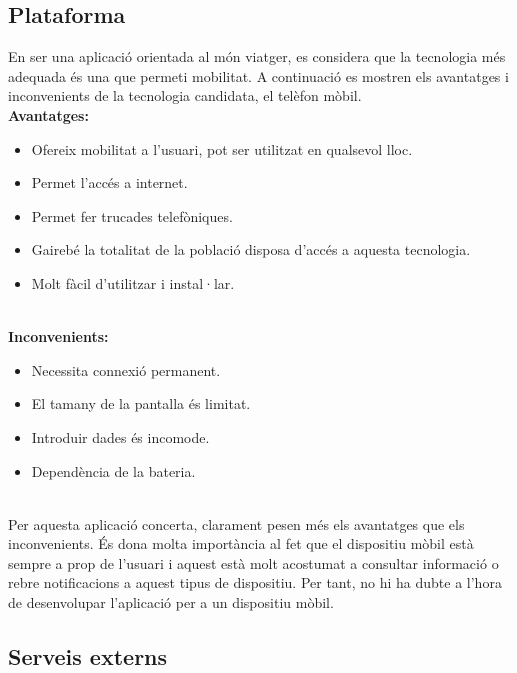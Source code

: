 \subsection{Plataforma}
En ser una aplicació orientada al món viatger, es considera que la tecnologia més adequada és una que permeti mobilitat. A continuació es mostren els avantatges i inconvenients de la tecnologia candidata, el telèfon mòbil.\\
\textbf{Avantatges:}
\begin{itemize}
\item{}Ofereix mobilitat a l'usuari, pot ser utilitzat en qualsevol lloc.
\item{}Permet l'accés a internet.
\item{}Permet fer trucades telefòniques.
\item{}Gairebé la totalitat de la població disposa d'accés a aquesta tecnologia.
\item{}Molt fàcil d'utilitzar i instal·lar.
\end{itemize}
\\
\textbf{Inconvenients:}
\begin{itemize}
\item{}Necessita connexió permanent.
\item{}El tamany de la pantalla és limitat.
\item{}Introduir dades és incomode.
\item{}Dependència de la bateria.
\end{itemize}
\\
Per aquesta aplicació concerta, clarament pesen més els avantatges que els
inconvenients. És dona molta importància al fet que el dispositiu mòbil
està sempre a prop de l'usuari i aquest està molt acostumat a consultar
informació o rebre notificacions a aquest tipus de dispositiu. Per tant, no
hi ha dubte a l'hora de desenvolupar l'aplicació per a un dispositiu mòbil.

\subsection{Serveis externs}

